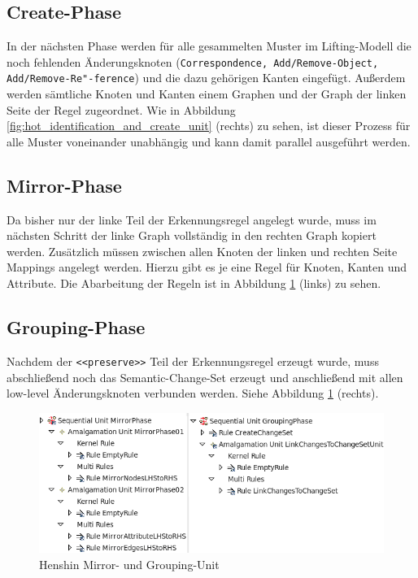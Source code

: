 \subsection{Create-Phase} 

In der nächsten Phase werden für alle gesammelten Muster im Lifting-Modell die noch fehlenden
Änderungsknoten (\texttt{Correspondence, Add/Remove-Object, Add/Remove-Re"-ference}) und die dazu
gehörigen Kanten eingefügt. Außerdem werden sämtliche Knoten und Kanten einem Graphen und der Graph
der linken Seite der Regel zugeordnet. Wie in Abbildung \ref{fig:hot_identification_and_create_unit}
(rechts) zu sehen, ist dieser Prozess für alle Muster voneinander unabhängig und kann damit
parallel ausgeführt werden.

\subsection{Mirror-Phase} 

Da bisher nur der linke Teil der Erkennungsregel angelegt wurde, muss im nächsten Schritt der linke
Graph vollständig in den rechten Graph kopiert werden. Zusätzlich müssen zwischen allen Knoten der
linken und rechten Seite Mappings angelegt werden. Hierzu gibt es je eine Regel für Knoten, Kanten
und Attribute. Die Abarbeitung der Regeln ist in Abbildung \ref{fig:hot_mirror and_grouping_unit}
(links) zu sehen.


\subsection{Grouping-Phase} 

Nachdem der \texttt{<<preserve>>} Teil der Erkennungsregel erzeugt wurde, muss abschließend noch das
Semantic-Change-Set erzeugt und anschließend mit allen low-level Änderungsknoten verbunden werden.
Siehe Abbildung \ref{fig:hot_mirror and_grouping_unit} (rechts).

\begin{figure}[h!]
  \centering
  \includegraphics[scale=0.8]{images/hot_mirror_and_grouping_unit.png}
  \caption{Henshin Mirror- und Grouping-Unit}
  \label{fig:hot_mirror and_grouping_unit}
\end{figure}

